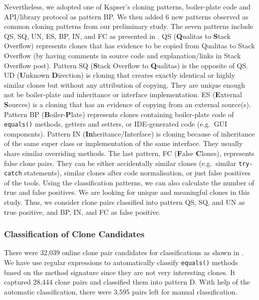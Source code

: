 \documentclass{sig-alternate-05-2015}
\begin{document}
Nevertheless, we adopted one of Kapser's cloning patterns, boiler-plate code and API/library protocol as pattern BP. We then added 6 new patterns observed as common cloning patterns from our preliminary study. The seven patterns include QS, SQ, UN, ES, BP, IN, and FC as presented in . QS (\textbf{Q}ualitas to \textbf{S}tack Overflow) represents clones that has evidence to be copied from Qualitas to Stack Overflow (by having comments in source code and explanation/links in Stack Overflow post). Pattern SQ (\textbf{S}tack Overflow to \textbf{Q}ualitas) is the opposite of QS. UD (\textbf{U}nknown \textbf{D}irection) is cloning that creates exactly identical or highly similar clones but without any attribution of copying. They are unique enough not be boiler-plate and inheritance or interface implementation. ES (\textbf{E}xternal \textbf{S}ources) is a cloning that has an evidence of copying from an external source(s). Pattern BP (\textbf{B}oiler-\textbf{P}late) represents clones containing boiler-plate code of \verb|equals()| methods, getters and setters, or IDE-generated code (e.g.~GUI components). Pattern IN (\textbf{In}heritance/Interface) is cloning because of inheritance of the same super class or implementation of the same interface. They usually share similar overriding methods. The last pattern, FC (\textbf{F}alse \textbf{C}lones), represents false clone pairs. They can be either accidentally similar clones (e.g.~similar \texttt{try-catch} statements), similar clones after code normalisation, or just false positives of the tools. Using the classification patterns, we can also calculate the number of true and false positives. We are looking for unique and meaningful clones in this study. Thus, we consider clone pairs classified into pattern QS, SQ, and UN as true positive, and BP, IN, and FC as false positive.

\subsubsection{Classification of Clone Candidates}

There were 32,039 online clone pair candidates for classifications as shown in . We have use regular expressions to automatically classify \texttt{equals()} methods based on the method signature since they are not very interesting clones. It captured 28,444 clone pairs and classified them into pattern D. With help of the automatic classification, there were 3,595 pairs left for manual classification.
\end{document}
